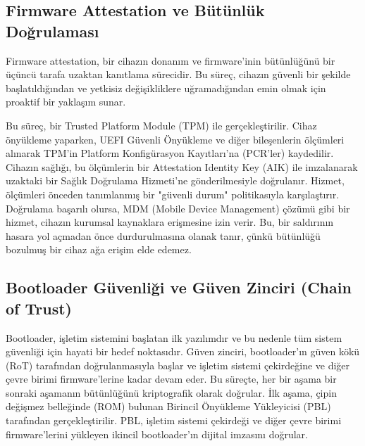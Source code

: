 \subsection{Firmware Attestation ve Bütünlük Doğrulaması}

Firmware attestation, bir cihazın donanım ve firmware'inin bütünlüğünü bir üçüncü tarafa uzaktan kanıtlama sürecidir. Bu süreç, cihazın güvenli bir şekilde başlatıldığından ve yetkisiz değişikliklere uğramadığından emin olmak için proaktif bir yaklaşım sunar.

Bu süreç, bir Trusted Platform Module (TPM) ile gerçekleştirilir. Cihaz önyükleme yaparken, UEFI Güvenli Önyükleme ve diğer bileşenlerin ölçümleri alınarak TPM'in Platform Konfigürasyon Kayıtları'na (PCR'ler) kaydedilir. Cihazın sağlığı, bu ölçümlerin bir Attestation Identity Key (AIK) ile imzalanarak uzaktaki bir Sağlık Doğrulama Hizmeti'ne gönderilmesiyle doğrulanır. Hizmet, ölçümleri önceden tanımlanmış bir "güvenli durum" politikasıyla karşılaştırır. Doğrulama başarılı olursa, MDM (Mobile Device Management) çözümü gibi bir hizmet, cihazın kurumsal kaynaklara erişmesine izin verir. Bu, bir saldırının hasara yol açmadan önce durdurulmasına olanak tanır, çünkü bütünlüğü bozulmuş bir cihaz ağa erişim elde edemez.

\subsection{Bootloader Güvenliği ve Güven Zinciri (Chain of Trust)}

Bootloader, işletim sistemini başlatan ilk yazılımdır ve bu nedenle tüm sistem güvenliği için hayati bir hedef noktasıdır. Güven zinciri, bootloader'ın güven kökü (RoT) tarafından doğrulanmasıyla başlar ve işletim sistemi çekirdeğine ve diğer çevre birimi firmware'lerine kadar devam eder. Bu süreçte, her bir aşama bir sonraki aşamanın bütünlüğünü kriptografik olarak doğrular. İlk aşama, çipin değişmez belleğinde (ROM) bulunan Birincil Önyükleme Yükleyicisi (PBL) tarafından gerçekleştirilir. PBL, işletim sistemi çekirdeği ve diğer çevre birimi firmware'lerini yükleyen ikincil bootloader'ın dijital imzasını doğrular.

